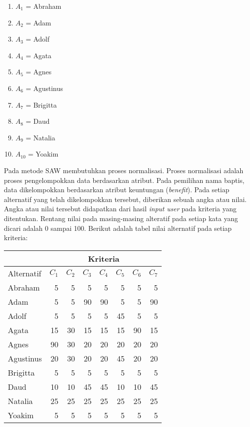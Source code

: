 \documentclass[a4paper,twoside]{article}
\begin{document}
\begin{enumerate}
\begin{enumerate}
	\item $A_{1}$ = Abraham
	\item $A_{2}$ = Adam
	\item $A_{3}$ = Adolf
	\item $A_{4}$ = Agata
	\item $A_{5}$ = Agnes
	\item $A_{6}$ = Agustinus
	\item $A_{7}$ = Brigitta
	\item $A_{8}$ = Daud
	\item $A_{9}$ = Natalia
	\item $A_{10}$ = Yoakim
\end{enumerate}

Pada metode SAW membutuhkan proses normalisasi. Proses normalisasi adalah proses pengelompokkan data berdasarkan atribut. Pada pemilihan nama baptis, data dikelompokkan berdasarkan atribut keuntungan (\textit{benefit}). Pada setiap alternatif yang telah dikelompokkan tersebut, diberikan sebuah angka atau nilai. Angka atau nilai tersebut didapatkan dari hasil \textit{input user} pada kriteria yang ditentukan. Rentang nilai pada masing-masing alteratif pada setiap kata yang dicari adalah 0 sampai 100. Berikut adalah tabel nilai alternatif pada setiap kriteria:
\begin{center}
\begin{tabular}{|l|r|r|r|r|r|r|r|}  
    \hline
    &
    \multicolumn{7}{|c|}{Kriteria} \\
		\hline
    Alternatif    & $C_{1}$ & $C_{2}$ & $C_{3}$ & $C_{4}$ & $C_{5}$ & $C_{6}$ & $C_{7}$ \\
    \hline
    Abraham     & 5&5&5&5&5&5&5     \\ \hline
    Adam	      & 5&5&90&90&5&5&90    \\ \hline
    Adolf       & 5&5&5&5&45&5&5      \\ \hline
    Agata       & 15&30&15&15&15&90&15  \\ \hline
		Agnes    		& 90&30&20&20&20&20&20     \\ \hline
    Agustinus	  & 20&30&20&20&45&20&20    \\ \hline
    Brigitta    & 5&5&5&5&5&5&5      \\ \hline
    Daud       	& 10&10&45&45&10&10&45  \\ \hline
		Natalia     & 25&25&25&25&25&25&25      \\ \hline
    Yoakim      & 5&5&5&5&5&5&5  \\ \hline
    

\end{tabular}
\end{center}
\end{enumerate}
\end{document}

